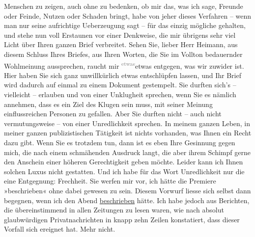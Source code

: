 \begin{ledgroupsized}[t]{13cm}
               Menschen zu zeigen, auch ohne zu bedenken, ob mir das, was ich sage, Freunde oder
               Feinde, Nutzen oder Schaden bringt, habe von jeher dieses Verfahren – wenn man nur
               seine aufrichtige Ueberzeugung sagt – für das einzig mögliche gehalten, und stehe nun
               voll Erstaunen vor einer Denkweise, die mir übrigens sehr viel Licht über Ihren
               ganzen Brief verbreitet.\pend
           \pstart
           Sehen Sie, lieber Herr Heimann, aus diesem
               Schluss Ihres Briefes, aus Ihren Worten, die Sie im Vollton bedauernder Wohlmeinung
               aussprechen, raucht mir \substVorne{}\textsuperscript{\textcolor{gray}{etwas}}\substDazwischen{}etwas\substHinten{} entgegen, was wir zuwider ist. Hier haben Sie sich ganz unwillkürlich etwas
               entschlüpfen lassen, und Ihr Brief wird dadurch auf einmal zu einem Dokument
               gestempelt.\pend
           \pstart
           Sie durften sich’s – vielleicht – erlauben und von einer Unklugheit sprechen, wenn
               Sie es nämlich annehmen, dass es ein Ziel des Klugen sein muss, mit seiner Meinung
               einflussreichen Personen zu gefallen. Aber Sie durften nicht – auch nicht
               vermutungsweise – von einer Unredlichkeit sprechen. In meinem ganzen Leben, in mei{\pb}ner ganzen publizistischen
               Tätigkeit ist nichts vorhanden, was Ihnen ein Recht dazu gibt. Wenn Sie es trotzdem
               tun, dann ist es eben Ihre Gesinnung gegen mich, die nach einem schmähenden Ausdruck
               langt, die aber ihrem Schimpf gerne den Anschein einer höheren Gerechtigkeit geben
               möchte. Leider kann ich Ihnen solchen Luxus nicht gestatten. Und ich habe für das
               Wort Unredlichkeit nur die eine Entgegnung: Frechheit.\pend
           \pstart
           Sie werfen mir vor, ich hätte die Premiere »beschrieben« ohne dabei gewesen zu sein. Diesem Vorwurf liesse
               sich selbst dann begegnen, wenn ich den Abend \uline{beschrieben} hätte. Ich habe jedoch aus Berichten, die übereinstimmend in
               allen Zeitungen zu lesen waren, wie nach absolut glaubwürdigen Privatnachrichten in
               knapp zehn Zeilen konstatiert, dass dieser Vorfall sich ereignet hat. Mehr nicht.

\end{ledgroupsized}
